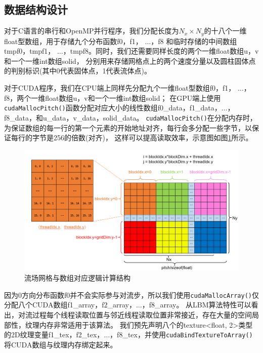 \documentclass[UTF8]{ctexart}
\begin{document}
        \subsection{数据结构设计}
        对于C语言的串行和OpenMP并行程序，我们分配长度为$N_x\times N_y$的十八个一维float型数组，用于存储九个分布函数f0，f1， $\ldots$，f8
        和临时存储的中间数组tmpf0，tmpf1， $\ldots$，tmpf8。同时，我们还需要同样长度的两个一维float数组u，v和一个一维int数组solid，
        分别用来存储网格点上的两个速度分量以及圆柱固体点的判别标识(其中0代表固体点，1代表流体点)。

        对于CUDA程序，我们在CPU端上同样先分配九个一维float型数组f0，f1， $\ldots$，f8，两个一维float数组u，v和一个一维int数组solid；
        在GPU端上使用\texttt{cudaMallocPitch()}函数分配对应大小的线性数组f0\_data，f1\_data，$\ldots$，f8\_data，和u\_data，v\_data，solid\_data。
        \texttt{cudaMallocPitch()}在分配内存时，为保证数组的每一行的第一个元素的开始地址对齐，每行会多分配一些字节，以保证每行的字节是256的倍数(对齐)，
        这样可以提高读取效率，示意图如图\ref{fig:grid}所示。
        \begin{figure}[htbp]
            \centering
            \includegraphics[scale=0.4]{./figures/grid.png}
            \caption{\textup{\heiti 流场网格与数组对应逻辑计算结构} }
            \label{fig:grid}
        \end{figure}

        因为0方向分布函数f0并不会实际参与对流步，所以我们使用\texttt{cudaMallocArray()}仅分配八个CUDA数组f1\_array，f2\_array，$\ldots$，f8\_array。
        从LBM算法特性可以看出，对流过程每个线程读取位置与邻近线程读取位置非常接近，存在大量的空间局部性，纹理内存非常适用于该算法。
        我们预先声明八个的texture<float, 2>类型的2D纹理变量f1\_tex，f2\_tex，$\ldots$，f8\_tex，并使用\texttt{cudaBindTextureToArray()}将CUDA数组与纹理内存绑定起来。
\end{document}
